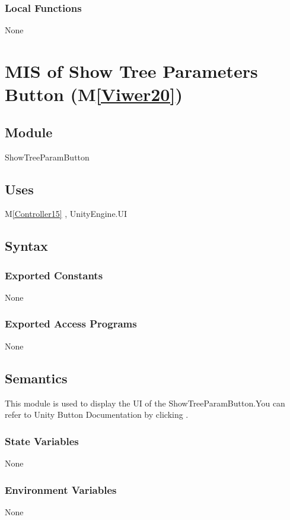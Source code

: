 \documentclass[12pt, titlepage]{article}
\newcommand{\mref}[1]{M\ref{#1}}
\begin{document}
\subsubsection{Local Functions}
None


\newpage

\section{MIS of Show Tree Parameters Button (\mref{Viwer20})}

\subsection{Module}
ShowTreeParamButton

\subsection{Uses}
\mref{Controller15}  , UnityEngine.UI

\subsection{Syntax}
\subsubsection{Exported Constants}
None
\subsubsection{Exported Access Programs}
None


\subsection{Semantics}
This module is used to display the UI of the 
ShowTreeParamButton.You can refer to Unity Button Documentation by
clicking \bref.

\subsubsection{State Variables}
None

\subsubsection{Environment Variables}
None
\end{document}
